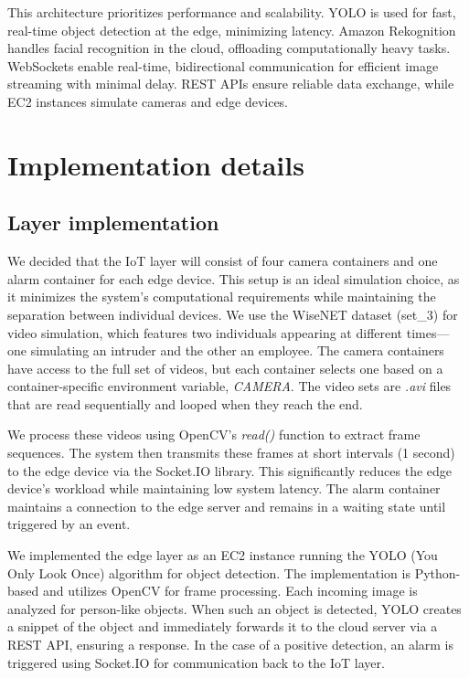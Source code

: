 \documentclass[conference]{IEEEtran}
\begin{document}
This architecture prioritizes performance and scalability. YOLO is used for fast, real-time object detection at the edge, minimizing latency. Amazon Rekognition handles facial recognition in the cloud, offloading computationally heavy tasks. WebSockets enable real-time, bidirectional communication for efficient image streaming with minimal delay. REST APIs ensure reliable data exchange, while EC2 instances simulate cameras and edge devices. 

\section{Implementation details}


\subsection{Layer implementation}
We decided that the IoT layer will consist of four camera containers and one alarm container for each edge device. This setup is an ideal simulation choice, as it minimizes the system’s computational requirements while maintaining the separation between individual devices. We use the WiseNET dataset (set\_3) for video simulation, which features two individuals appearing at different times—one simulating an intruder and the other an employee. The camera containers have access to the full set of videos, but each container selects one based on a container-specific environment variable, \textit{CAMERA}. The video sets are \textit{.avi} files that are read sequentially and looped when they reach the end.

We process these videos using OpenCV's \textit{read()} function to extract frame sequences. The system then transmits these frames at short intervals (1 second) to the edge device via the Socket.IO library. This significantly reduces the edge device's workload while maintaining low system latency. The alarm container maintains a connection to the edge server and remains in a waiting state until triggered by an event.\hfill \break

We implemented the edge layer as an EC2 instance running the YOLO (You Only Look Once) algorithm for object detection. The implementation is Python-based and utilizes OpenCV for frame processing. Each incoming image is analyzed for person-like objects. When such an object is detected, YOLO creates a snippet of the object and immediately forwards it to the cloud server via a REST API, ensuring a response. In the case of a positive detection, an alarm is triggered using Socket.IO for communication back to the IoT layer.\hfill \break
\end{document}
